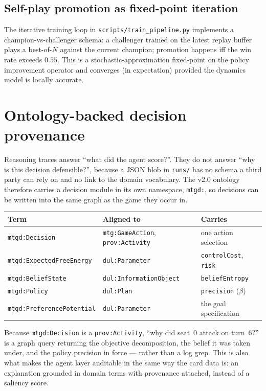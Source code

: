 \documentclass[11pt,a4paper]{article}
\begin{document}
\subsection{Self-play promotion as fixed-point iteration}
The iterative training loop in \texttt{scripts/train\_pipeline.py}
implements a champion-vs-challenger schema: a challenger trained on
the latest replay buffer plays a best-of-$N$ against the current
champion; promotion happens iff the win rate exceeds $0.55$.  This is
a stochastic-approximation fixed-point on the policy improvement
operator and converges (in expectation) provided the dynamics model is
locally accurate.

\section{Ontology-backed decision provenance}
\label{sec:decision-ontology}

Reasoning traces answer ``what did the agent score?''. They do not answer
``why is this decision defensible?'', because a JSON blob in
\texttt{runs/} has no schema a third party can rely on and no link to the
domain vocabulary. The v2.0 ontology therefore carries a decision module
in its own namespace, \texttt{mtgd:}, so decisions can be written into the
same graph as the game they occur in.

\begin{center}\small
\begin{tabular}{lll}
\toprule
Term & Aligned to & Carries \\
\midrule
\texttt{mtgd:Decision} & \texttt{mtg:GameAction}, \texttt{prov:Activity} & one action selection \\
\texttt{mtgd:ExpectedFreeEnergy} & \texttt{dul:Parameter} & \texttt{controlCost}, \texttt{risk} \\
\texttt{mtgd:BeliefState} & \texttt{dul:InformationObject} & \texttt{beliefEntropy} \\
\texttt{mtgd:Policy} & \texttt{dul:Plan} & \texttt{precision} ($\beta$) \\
\texttt{mtgd:PreferencePotential} & \texttt{dul:Parameter} & the goal specification \\
\bottomrule
\end{tabular}
\end{center}

Because \texttt{mtgd:Decision} is a \texttt{prov:Activity}, ``why did seat~0
attack on turn~6?'' is a graph query returning the objective
decomposition, the belief it was taken under, and the policy precision in
force --- rather than a log grep. This is also what makes the agent layer
auditable in the same way the card data is: an explanation grounded in
domain terms with provenance attached, instead of a saliency score.
\end{document}

